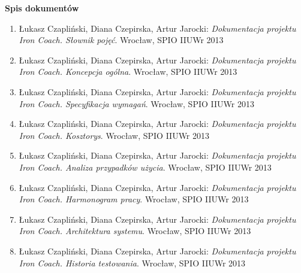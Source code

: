 


\newcommand{\quickbib}[1]{\item Łukasz Czapliński, Diana Czepirska, Artur Jarocki: {\it Dokumentacja projektu Iron Coach. #1}. Wrocław, SPIO IIUWr 2013}

\vspace*{1cm}
{\textbf{\Large{Spis dokumentów}}}\vspace{0.5cm}
\large
\begin{enumerate}\itemsep5pt
      \quickbib{Słownik pojęć}
      \quickbib{Koncepcja ogólna}
      \quickbib{Specyfikacja wymagań}
      \quickbib{Kosztorys}
      \quickbib{Analiza przypadków użycia}
      \quickbib{Harmonogram pracy}
      \quickbib{Architektura systemu}
      \quickbib{Historia testowania}
\end{enumerate}
\vfill



